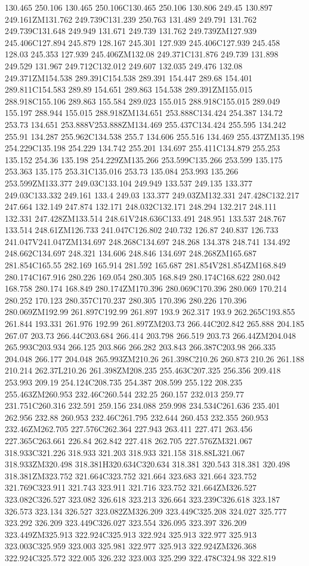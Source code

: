 130.465 250.106 130.465 250.106C130.465 250.106 130.806 249.45 130.897 249.161ZM131.762 249.739C131.239 250.763 131.489 249.791 131.762 249.739C131.648 249.949 131.671 249.739 131.762 249.739ZM127.939 245.406C127.894 245.879 128.167 245.301 127.939 245.406C127.939 245.458 128.03 245.353 127.939 245.406ZM132.08 249.371C131.876 249.739 131.898 249.529 131.967 249.712C132.012 249.607 132.035 249.476 132.08 249.371ZM154.538 289.391C154.538 289.391 154.447 289.68 154.401 289.811C154.583 289.89 154.651 289.863 154.538 289.391ZM155.015 288.918C155.106 289.863 155.584 289.023 155.015 288.918C155.015 289.049 155.197 288.944 155.015 288.918ZM134.651 253.888C134.424 254.387 134.72 253.73 134.651 253.888V253.888ZM134.469 255.437C134.424 255.595 134.242 255.91 134.287 255.962C134.538 255.7 134.606 255.516 134.469 255.437ZM135.198 254.229C135.198 254.229 134.742 255.201 134.697 255.411C134.879 255.253 135.152 254.36 135.198 254.229ZM135.266 253.599C135.266 253.599 135.175 253.363 135.175 253.31C135.016 253.73 135.084 253.993 135.266 253.599ZM133.377 249.03C133.104 249.949 133.537 249.135 133.377 249.03C133.332 249.161 133.4 249.03 133.377 249.03ZM132.331 247.428C132.217 247.664 132.149 247.874 132.171 248.032C132.171 248.294 132.217 248.111 132.331 247.428ZM133.514 248.61V248.636C133.491 248.951 133.537 248.767 133.514 248.61ZM126.733 241.047C126.802 240.732 126.87 240.837 126.733 241.047V241.047ZM134.697 248.268C134.697 248.268 134.378 248.741 134.492 248.662C134.697 248.321 134.606 248.846 134.697 248.268ZM165.687 281.854C165.55 282.169 165.914 281.592 165.687 281.854V281.854ZM168.849 280.174C167.916 280.226 169.054 280.305 168.849 280.174C168.622 280.042 168.758 280.174 168.849 280.174ZM170.396 280.069C170.396 280.069 170.214 280.252 170.123 280.357C170.237 280.305 170.396 280.226 170.396 280.069ZM192.99 261.897C192.99 261.897 193.9 262.317 193.9 262.265C193.855 261.844 193.331 261.976 192.99 261.897ZM203.73 266.44C202.842 265.888 204.185 267.07 203.73 266.44C203.684 266.414 203.798 266.519 203.73 266.44ZM204.048 265.993C203.934 266.125 203.866 266.282 203.843 266.387C203.98 266.335 204.048 266.177 204.048 265.993ZM210.26 261.398C210.26 260.873 210.26 261.188 210.214 262.37L210.26 261.398ZM208.235 255.463C207.325 256.356 209.418 253.993 209.19 254.124C208.735 254.387 208.599 255.122 208.235 255.463ZM260.953 232.46C260.544 232.25 260.157 232.013 259.77 231.751C260.316 232.591 259.156 234.088 259.998 234.534C261.636 235.401 262.956 232.88 260.953 232.46C261.795 232.644 260.453 232.355 260.953 232.46ZM262.705 227.576C262.364 227.943 263.411 227.471 263.456 227.365C263.661 226.84 262.842 227.418 262.705 227.576ZM321.067 318.933C321.226 318.933 321.203 318.933 321.158 318.88L321.067 318.933ZM320.498 318.381H320.634C320.634 318.381 320.543 318.381 320.498 318.381ZM323.752 321.664C323.752 321.664 323.683 321.664 323.752 321.769C323.911 321.743 323.911 321.716 323.752 321.664ZM326.527 323.082C326.527 323.082 326.618 323.213 326.664 323.239C326.618 323.187 326.573 323.134 326.527 323.082ZM326.209 323.449C325.208 324.027 325.777 323.292 326.209 323.449C326.027 323.554 326.095 323.397 326.209 323.449ZM325.913 322.924C325.913 322.924 325.913 322.977 325.913 323.003C325.959 323.003 325.981 322.977 325.913 322.924ZM326.368 322.924C325.572 322.005 326.232 323.003 325.299 322.478C324.98 322.819 